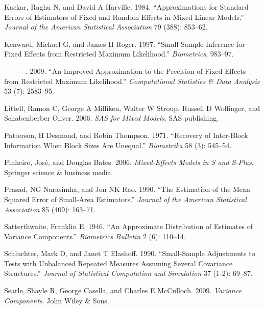 \documentclass{article}
\begin{document}
\leavevmode\hypertarget{ref-kackar1984approximations}{}%
Kackar, Raghu N, and David A Harville. 1984. ``Approximations for
Standard Errors of Estimators of Fixed and Random Effects in Mixed
Linear Models.'' \emph{Journal of the American Statistical Association}
79 (388): 853--62.

\leavevmode\hypertarget{ref-kenward1997small}{}%
Kenward, Michael G, and James H Roger. 1997. ``Small Sample Inference
for Fixed Effects from Restricted Maximum Likelihood.''
\emph{Biometrics}, 983--97.

\leavevmode\hypertarget{ref-kenward2009improved}{}%
---------. 2009. ``An Improved Approximation to the Precision of Fixed
Effects from Restricted Maximum Likelihood.'' \emph{Computational
Statistics \& Data Analysis} 53 (7): 2583--95.

\leavevmode\hypertarget{ref-littell2006sas}{}%
Littell, Ramon C, George A Milliken, Walter W Stroup, Russell D
Wolfinger, and Schabenberber Oliver. 2006. \emph{SAS for Mixed Models}.
SAS publishing.

\leavevmode\hypertarget{ref-patterson1971recovery}{}%
Patterson, H Desmond, and Robin Thompson. 1971. ``Recovery of
Inter-Block Information When Block Sizes Are Unequal.''
\emph{Biometrika} 58 (3): 545--54.

\leavevmode\hypertarget{ref-pinheiro2006mixed}{}%
Pinheiro, José, and Douglas Bates. 2006. \emph{Mixed-Effects Models in S
and S-Plus}. Springer science \& business media.

\leavevmode\hypertarget{ref-prasad1990estimation}{}%
Prasad, NG Narasimha, and Jon NK Rao. 1990. ``The Estimation of the Mean
Squared Error of Small-Area Estimators.'' \emph{Journal of the American
Statistical Association} 85 (409): 163--71.

\leavevmode\hypertarget{ref-satterthwaite1946approximate}{}%
Satterthwaite, Franklin E. 1946. ``An Approximate Distribution of
Estimates of Variance Components.'' \emph{Biometrics Bulletin} 2 (6):
110--14.

\leavevmode\hypertarget{ref-schluchter1990small}{}%
Schluchter, Mark D, and Janet T Elashoff. 1990. ``Small-Sample
Adjustments to Tests with Unbalanced Repeated Measures Assuming Several
Covariance Structures.'' \emph{Journal of Statistical Computation and
Simulation} 37 (1-2): 69--87.

\leavevmode\hypertarget{ref-searle2009variance}{}%
Searle, Shayle R, George Casella, and Charles E McCulloch. 2009.
\emph{Variance Components}. John Wiley \& Sons.
\end{document}
